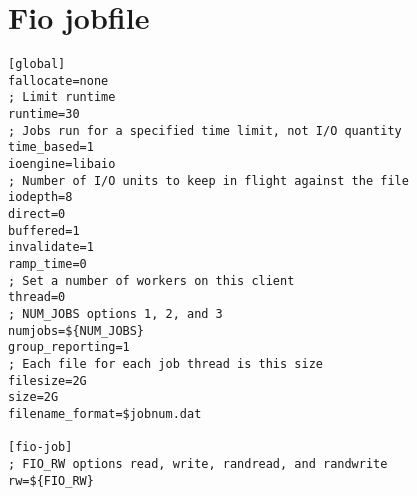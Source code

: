 \chapter{Fio jobfile}
\label{appendix:fio_jobfile}

\begin{lstlisting}
[global]
fallocate=none
; Limit runtime
runtime=30
; Jobs run for a specified time limit, not I/O quantity
time_based=1
ioengine=libaio
; Number of I/O units to keep in flight against the file
iodepth=8
direct=0
buffered=1
invalidate=1
ramp_time=0
; Set a number of workers on this client
thread=0
; NUM_JOBS options 1, 2, and 3
numjobs=${NUM_JOBS}
group_reporting=1
; Each file for each job thread is this size
filesize=2G
size=2G
filename_format=$jobnum.dat

[fio-job]
; FIO_RW options read, write, randread, and randwrite
rw=${FIO_RW}
\end{lstlisting}

